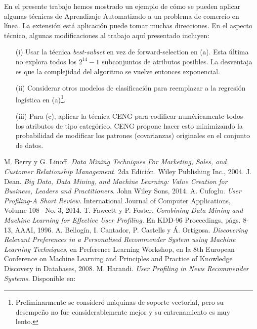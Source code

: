 \documentclass[letterpaper,11pt]{article}
\begin{document}
\begin{multicols}{2}
En el presente trabajo hemos mostrado un ejemplo de cómo se pueden aplicar algunas técnicas de Aprendizaje Automatizado
a un problema de comercio en línea. La extensión está aplicación puede tomar muchas direcciones. En el aspecto técnico,
algunas modificaciones al trabajo aquí presentado incluyen:

\begin{enumerate}
    \item[(i)] Usar la técnica \emph{best-subset}\cite[Cap. 6]{book1} en vez de forward-selection en (a). Esta
        última  no explora todos los $2^{14}-1$ subconjuntos de atributos posibles. La desventaja es que la
        complejidad del algoritmo se vuelve entonces exponencial. 
    \item[(ii)] Considerar otros modelos de clasificación para reemplazar a la regresión logística en (a)\footnote{
        Preliminarmente se consideró máquinas de soporte vectorial, pero su desempeño no fue considerablemente mejor y
    su entrenamiento es muy lento.}. 
    \item[(iii)] Para (c), aplicar la técnica CENG\cite{kuri} para codificar numéricamente todos los atributos de tipo
        categórico. CENG propone hacer esto minimizando la probabilidad de modificar los patrones (covarianzas) originales 
        en el conjunto de datos.
\end{enumerate}
\begin{thebibliography}{10}
        {\small 
     M. Berry y G. Linoff. {\em Data Mining Techniques For Marketing, Sales, and Customer Relationship Management.} 
        2da Edición. Wiley Publishing Inc., 2004. 
     J. Dean. {\em Big Data, Data Mining, and Machine Learning: Value Creation for Business, Leaders and
        Practitioners}. John Wiley  Sons, 2014.
         A. Cufoglu. {\em User Profiling-A Short Review}. International Journal of Computer Applications,
        Volume 108-- No. 3, 2014.
     T. Fawcett y P. Foster. {\em Combining Data Mining and Machine Learning for Effective User
        Profiling.} En KDD-96 Proceedings, págs. 8-13, AAAI, 1996.
     A. Bellogín, I. Cantador, P. Castells y Á. Ortigosa. {\em Discovering Relevant Preferences in a Personalised
        Recommender System using Machine Learning Techniques}, en Preference Learning Workshop, en la 8th
        European Conference on Machine  Learning and Principles and Practice of Knowledge Discovery in Databases, 2008. 
     M. Harandi. {\em User Profiling in News Recommender Systems}. Disponible en:
}
\end{thebibliography}
\end{multicols}
\end{document}
